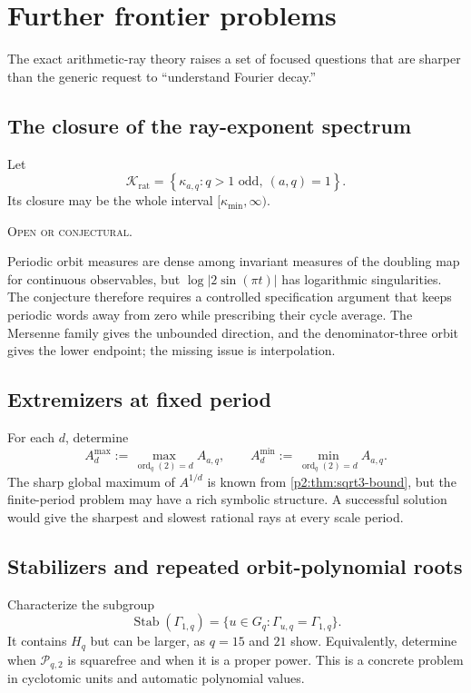 \documentclass[11pt,oneside]{article}
\theoremstyle{definition}
\theoremstyle{remark}
\newcommand{\ord}{\operatorname{ord}}
\newcommand{\openstatus}{\textcolor{conjectureorange}{\textsc{Open or conjectural.}}}
\begin{document}
\section{Further frontier problems}\label{p2:sec:open}

The exact arithmetic-ray theory raises a set of focused questions that are sharper
than the generic request to ``understand Fourier decay.''

\subsection{The closure of the ray-exponent spectrum}

\begin{conjecture}
Let
\[
 \mathcal K_{\mathrm{rat}}=
 \left\{\kappa_{a,q}:q>1\text{ odd},\ (a,q)=1\right\}.
\]
Its closure may be the whole interval $[\kappa_{\min},\infty)$.

\smallskip\noindent\openstatus
\end{conjecture}

Periodic orbit measures are dense among invariant measures of the doubling map for
continuous observables, but $\log|2\sin(\pi t)|$ has logarithmic singularities. The
conjecture therefore requires a controlled specification argument that keeps
periodic words away from zero while prescribing their cycle average. The Mersenne
family gives the unbounded direction, and the denominator-three orbit gives the
lower endpoint; the missing issue is interpolation.

\subsection{Extremizers at fixed period}

For each $d$, determine
\[
 A_d^{\max}:=\max_{\ord_q(2)=d}A_{a,q},
 \qquad
 A_d^{\min}:=\min_{\ord_q(2)=d}A_{a,q}.
\]
The sharp global maximum of $A^{1/d}$ is known from \cref{p2:thm:sqrt3-bound}, but the
finite-period problem may have a rich symbolic structure. A successful solution
would give the sharpest and slowest rational rays at every scale period.

\subsection{Stabilizers and repeated orbit-polynomial roots}

Characterize the subgroup
\[
 \operatorname{Stab}(\Gamma_{1,q})
 =\{u\in G_q:\Gamma_{u,q}=\Gamma_{1,q}\}.
\]
It contains $H_q$ but can be larger, as $q=15$ and $21$ show. Equivalently, determine
when $\mathscr P_{q,2}$ is squarefree and when it is a proper power. This is a
concrete problem in cyclotomic units and automatic polynomial values.
\end{document}
